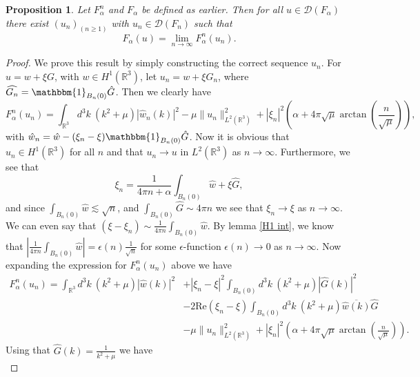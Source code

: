 \documentclass[a4paper,11pt]{article}
\newcommand{\Real}{\text{Re}}
\newcommand{\dom}[1]{\mathscr D\left(#1\right)}
\newcommand{\R}{\mathbb{R}}
\newtheorem{proposition}{Proposition}
\numberwithin{equation}{section}
\begin{document}
\begin{proposition}\label{F Gamma upper bound}
	Let $ F_\alpha^n $ and $ F_\alpha $ be defined as earlier. Then for all $ u\in\dom{F_\alpha} $ there exist $ (u_n)_{(n\geq1)} $ with $ u_n\in\dom{F_n} $ such that \begin{equation}
		F_\alpha(u)=\lim\limits_{n\to\infty}F^n_\alpha(u_n).
	\end{equation}
\end{proposition}
\begin{proof}
	We prove this result by simply constructing the correct sequence $ u_n $. For $ u=w+\xi G $, with $ w\in H^1(\R^3) $, let $ u_n=w+\xi G_n $, where $ \widehat{G_n}=\mathbbm{1}_{B_n(0)}\hat{G} $. Then we clearly have \begin{equation}
	F_\alpha^n(u_n)=\int_{\R^3} d^3k\ \left(k^2+\mu\right)|\hat{w}_n(k)|^2-\mu\|u_n\|^2_{L^2(\R^3)}+|\xi_n|^2\left(\alpha+4\pi\sqrt{\mu}\arctan\left(\frac{n}{\sqrt{\mu}}\right)\right),
	\end{equation}
	with $ \hat{w}_n=\hat{w}-(\xi_n-\xi)\mathbbm{1}_{B_n(0)}\hat{G} $. Now it is obvious that $ u_n\in H^1(\R^3) $ for all $ n $ and that $ u_n\to u $ in $ L^2(\R^3) $ as $ n\to\infty $. Furthermore, we see that \begin{equation}
	\xi_n=\frac{1}{4\pi n+\alpha}\int_{B_n(0)}\hat{w}+\xi\hat{G},
	\end{equation}
	and since $ \int_{B_n(0)}\hat{w}\lesssim\sqrt{n} $, and $\int_{B_n(0)}\hat{G}\sim4\pi n $ we see that $ \xi_n\to \xi $ as $ n\to\infty $. We can even say that $ (\xi-\xi_n)\sim \frac{1}{4\pi n}\int_{B_n(0)}\hat{w} $. By lemma \ref{H1 int}, we know that $ \left\lvert\frac{1}{4\pi n}\int_{B_n(0)}\hat{w}\right\rvert=\epsilon(n)\frac{1}{\sqrt{n}} $ for some $ \epsilon $-function $ \epsilon(n)\to0 $ as $ n\to\infty $. Now expanding the expression for $ F_\alpha^n(u_n) $ above we have \begin{equation}
	\begin{aligned}
	F_\alpha^n(u_n)=\int_{\R^3} d^3k\ \left(k^2+\mu\right)|\hat{w}(k)|^2&+|\xi_n-\xi|^2\int_{B_n(0)} d^3k\ \left(k^2+\mu\right)|\hat{G}(k)|^2\\&-2\Real(\xi_n-\xi)\int_{B_n(0)} d^3k\ \left(k^2+\mu\right)\overline{\hat{w}(k)}\hat{G}\\&-\mu\|u_n\|^2_{L^2(\R^3)}+|\xi_n|^2\left(\alpha+4\pi\sqrt{\mu}\arctan\left(\frac{n}{\sqrt{\mu}}\right)\right).
	\end{aligned}
	\end{equation} 
	Using that $ \hat{G}(k)=\frac{1}{k^2+\mu} $ we have\begin{equation}

\end{equation}
\end{proof}
\end{document}
